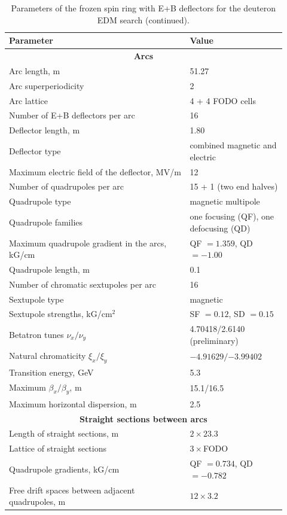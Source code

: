 \begin{table}[!htbp]
  \caption{Parameters of the frozen spin ring with E+B
    deflectors for the deuteron EDM search (continued).}
  \label{tab:dring-cont}
  \centering
  \renewcommand{\baselinestretch}{1}\small\selectfont
  \begin{tabular}{@{}p{0.60\linewidth}@{\hspace{1em}}p{0.32\linewidth}@{}}
    \toprule
    Parameter & Value \\
    \midrule
    \multicolumn{2}{c}{\textbf{Arcs}} \\
    \midrule
    Arc length, m & 51.27 \\
    Arc superperiodicity & 2 \\
    Arc lattice & 4 + 4 FODO cells \\
    Number of E+B deflectors per arc & 16 \\
    Deflector length, m & 1.80 \\
    Deflector type & combined magnetic and electric \\
    Maximum electric field of the deflector, MV/m & 12 \\
    Number of quadrupoles per arc & 15 + 1 (two end halves) \\
    Quadrupole type & magnetic multipole \\
    Quadrupole families & one focusing (QF), one defocusing (QD) \\
    Maximum quadrupole gradient in the arcs, kG/cm
      & QF $= 1.359$, QD $= -1.00$ \\
    Quadrupole length, m & 0.1 \\
    Number of chromatic sextupoles per arc & 16 \\
    Sextupole type & magnetic \\
    Sextupole strengths, kG/cm$^2$ & SF $= 0.12$, SD $= 0.15$ \\
    Betatron tunes $\nu_x/\nu_y$ & 4.70418/2.6140 (preliminary) \\
    Natural chromaticity $\xi_x/\xi_y$ & $-4.91629/{-3.99402}$ \\
    Transition energy, GeV & 5.3 \\
    Maximum $\beta_x/\beta_y$, m & 15.1/16.5 \\
    Maximum horizontal dispersion, m & 2.5 \\
    \midrule
    \multicolumn{2}{c}{\textbf{Straight sections between arcs}} \\
    \midrule
    Length of straight sections, m & $2\times 23.3$ \\
    Lattice of straight sections & $3\times$FODO \\
    Quadrupole gradients, kG/cm & QF $= 0.734$, QD $= -0.782$ \\
    Free drift spaces between adjacent quadrupoles, m & $12\times 3.2$ \\
    \bottomrule
  \end{tabular}
\end{table}

